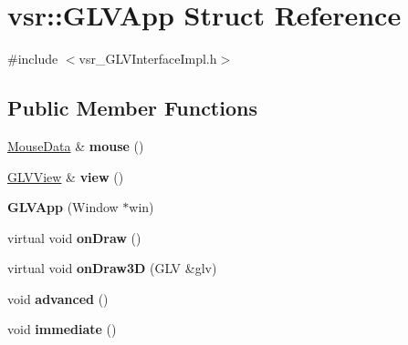 \hypertarget{structvsr_1_1_g_l_v_app}{\section{vsr\-:\-:G\-L\-V\-App Struct Reference}
\label{structvsr_1_1_g_l_v_app}
}


{\ttfamily \#include $<$vsr\-\_\-\-G\-L\-V\-Interface\-Impl.\-h$>$}

\subsection*{Public Member Functions}
\begin{DoxyCompactItemize}
\item 
\hypertarget{structvsr_1_1_g_l_v_app_a1d7f9750fa3f600a8824bcb3a8faf1b1}{\hyperlink{structvsr_1_1_mouse_data}{Mouse\-Data} \& {\bfseries mouse} ()}\label{structvsr_1_1_g_l_v_app_a1d7f9750fa3f600a8824bcb3a8faf1b1}

\item 
\hypertarget{structvsr_1_1_g_l_v_app_ab6fe450830ff2576963d707262ad75e2}{\hyperlink{structvsr_1_1_g_l_v_view}{G\-L\-V\-View} \& {\bfseries view} ()}\label{structvsr_1_1_g_l_v_app_ab6fe450830ff2576963d707262ad75e2}

\item 
\hypertarget{structvsr_1_1_g_l_v_app_a6865b8f93a1583bcf67ff116e0aa9e91}{{\bfseries G\-L\-V\-App} (Window $\ast$win)}\label{structvsr_1_1_g_l_v_app_a6865b8f93a1583bcf67ff116e0aa9e91}

\item 
\hypertarget{structvsr_1_1_g_l_v_app_aa9a007da70454ccb06a02158bc5f16fa}{virtual void {\bfseries on\-Draw} ()}\label{structvsr_1_1_g_l_v_app_aa9a007da70454ccb06a02158bc5f16fa}

\item 
\hypertarget{structvsr_1_1_g_l_v_app_a88f0eb04a55e6260fa79ed0841316886}{virtual void {\bfseries on\-Draw3\-D} (G\-L\-V \&glv)}\label{structvsr_1_1_g_l_v_app_a88f0eb04a55e6260fa79ed0841316886}

\item 
\hypertarget{structvsr_1_1_g_l_v_app_a71e2bb7e50e4673b0532af594e154d41}{void {\bfseries advanced} ()}\label{structvsr_1_1_g_l_v_app_a71e2bb7e50e4673b0532af594e154d41}

\item 
\hypertarget{structvsr_1_1_g_l_v_app_a82696bdd67c6b451c2e1d93d8294e92a}{void {\bfseries immediate} ()}\label{structvsr_1_1_g_l_v_app_a82696bdd67c6b451c2e1d93d8294e92a}


\end{DoxyCompactItemize}
